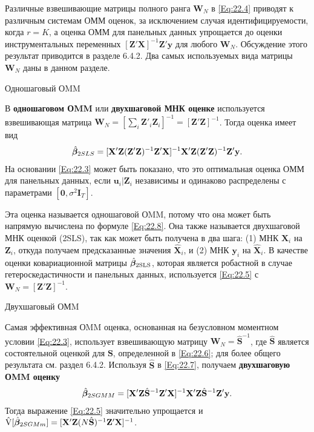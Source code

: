 Различные взвешивающие матрицы полного ранга $\mathbf W_N$ в \ref{Eq:22.4} приводят к различным системам ОММ оценок, за исключением случая идентифицируемости, когда $r=K$, а оценка ОММ для панельных данных упрощается до оценки инструментальных переменных $[\mathbf Z' \mathbf X]^{-1}\mathbf Z'\mathbf y$ для любого $\mathbf W_N$. Обсуждение этого результат приводится в разделе 6.4.2. Два самых используемых вида матрицы $\mathbf W_N$ даны в данном разделе.

{\centering Одношаговый ОMM}

В \textbf{одношаговом ОMM} или \textbf{двухшаговой МНК оценке} используется взвешивающая матрица $\mathbf W_N=[\sum_i \mathbf Z'_i \mathbf Z_i]^{-1}=[\mathbf Z' \mathbf Z]^{-1}$.  Тогда оценка имеет вид
\begin{align}
\hat{\bm{\beta}}_{2SLS} = [\mathbf X' \mathbf Z ( \mathbf Z' \mathbf Z)^{-1} \mathbf Z' \mathbf X]^{-1} \mathbf X' \mathbf Z (\mathbf Z' \mathbf Z)^{-1} \mathbf Z' \mathbf y.
\label{Eq:22.8}
\end{align}
На основании \ref{Eq:22.3} может быть показано, что это оптимальная оценка ОММ для панельных данных, если $\mathbf u_i | \mathbf Z_i$ независимы и одинаково распределены  с параметрами $[\mathbf 0, \sigma^2 \mathbf I_T]$.

Эта оценка называется одношаговой ОMM, потому что она может быть напрямую вычислена по формуле \ref{Eq:22.8}. Она также называется двухшаговой МНК оценкой (2SLS), так как может быть получена в два шага: (1) МНК $\mathbf X_i$ на $\mathbf Z_i$, откуда получаем предсказанные значения $\hat{\mathbf X}_i$, и (2) МНК $\mathbf y_i$ на $\hat{\mathbf X}_i$. В качестве оценки ковариационной матрицы $\hat{\bm{\beta}}_{\mathrm{2SLS}}$, которая является робастной в случае гетероскедастичности и панельных данных, используется \ref{Eq:22.5} с $\mathbf W_N=[\mathbf Z' \mathbf Z]^{-1}$.

{\centering Двухшаговый ОМM}

Самая эффективная ОMM оценка, основанная на безусловном моментном условии \ref{Eq:22.3}, использует взвешивающую матрицу $\mathbf W_N=\hat{\mathbf S}^{-1}$, где $\hat{\mathbf S}$  является состоятельной оценкой для $\mathbf S$, определенной в \ref{Eq:22.6}; для более общего результата см. раздел 6.4.2. Используя $\hat{\mathbf S}$ в \ref{Eq:22.7}, получаем \textbf{двухшаговую ОMM оценку}
\begin{align}
\hat{\bm{\beta}}_{2SGMM} = [\mathbf X' \mathbf Z \hat{\mathbf S}^{-1} \mathbf Z' \mathbf X]^{-1} \mathbf X' \mathbf Z \hat{\mathbf S}^{-1} \mathbf Z' \mathbf y.
\label{Eq:22.9}
\end{align}
Тогда выражение \ref{Eq:22.5} значительно упрощается и $\hat{\mathrm V}[\hat{\bm{\beta}}_{2SGMm}]=[\mathbf X' \mathbf Z (N \hat{\mathbf S})^{-1} \mathbf Z' \mathbf X]^{-1}$.

